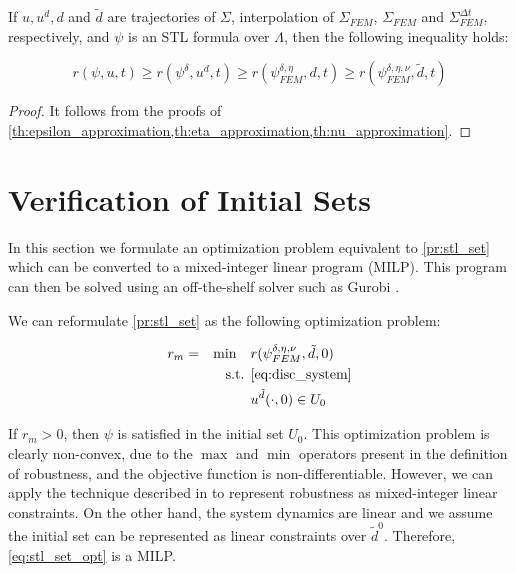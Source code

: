 \documentclass[oribibl]{llncs/llncs}
\begin{document}
\begin{theorem}
    \label{th:robustness}
    If $u, u^d, d$ and $\tilde{d}$ are trajectories of $\Sigma$, interpolation
    of $\Sigma_{FEM}$, $\Sigma_{FEM}$ and $\Sigma_{FEM}^{\Delta t}$,
    respectively, and $\psi$ is an STL formula over $\Lambda$, then the 
    following inequality holds:

    \begin{equation}
        r(\psi, u, t) \geq r(\psi^{\delta}, u^d, t) \geq r(\psi^{\delta,
        \eta}_{FEM}, d, t) \geq r(\psi^{\delta, \eta, \nu}_{FEM}, \tilde{d}, t)
    \end{equation}
\end{theorem}
\begin{proof}
    It follows from the proofs of
    \cref{th:epsilon_approximation,th:eta_approximation,th:nu_approximation}.
\end{proof}

\section{Verification of Initial Sets}
\label{sec:verification_of_initial_sets}

In this section we formulate an optimization problem equivalent to
\cref{pr:stl_set} which can be converted to a mixed-integer linear program
(MILP). This program can then be solved using an off-the-shelf solver such 
as Gurobi \cite{gurobi}.

We can reformulate \cref{pr:stl_set} as the following optimization problem:

\begin{equation}
    \label{eq:stl_set_opt}
    \begin{aligned}
        &r_m = &\min \quad &r(\psi^{\delta, \eta, \nu}_{FEM}, \tilde{d}, 0) \\
        &  &\text{s.t. } &\cref{eq:disc_system} \\
        &  & &u^{\tilde{d}}(\cdot, 0) \in U_0
    \end{aligned}
\end{equation}

If $r_m > 0$, then $\psi$ is satisfied in the initial set $U_0$. This
optimization problem is clearly non-convex, due to the $\max$ and $\min$
operators present in the definition of robustness, and the objective function is
non-differentiable. However, we can apply the technique described in
\cite{sadraddini_robust_2015} to
represent robustness as mixed-integer linear constraints. On the other hand, the
system dynamics are linear and we assume the initial set can be represented as
linear constraints over $\tilde{d}^0$. Therefore, \cref{eq:stl_set_opt} is a
MILP.
\end{document}
